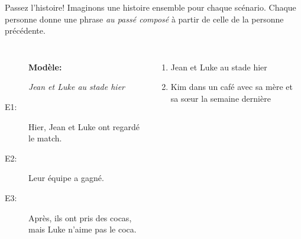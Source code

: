 \begin{frame}{Passez l'histoire!}
  Imaginons une histoire ensemble pour chaque scénario.
  Chaque personne donne une phrase \emph{au passé composé} à partir de celle de la personne précédente. \\
  \begin{columns}
      \begin{description}
        \item[] \textbf{Modèle:}
        \item[] \emph{Jean et Luke au stade hier}
        \item[E1:] Hier, Jean et Luke ont regardé le match.
        \item[E2:] Leur équipe a gagné.
        \item[E3:] Après, ils ont pris des cocas, mais Luke n'aime pas le coca.
      \end{description}
      \begin{enumerate}
        \item Jean et Luke au stade hier
        \item Kim dans un café avec sa mère et sa sœur la semaine dernière
      \end{enumerate}
  \end{columns}
\end{frame}